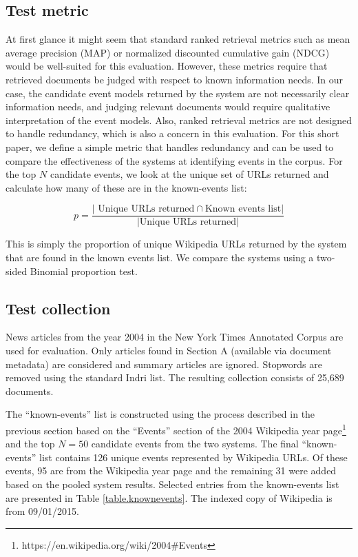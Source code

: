 \documentclass{sig-alternate}
\begin{document}
\subsection{Test metric}
At first glance it might seem that standard ranked retrieval metrics such as mean average precision (MAP) or normalized discounted cumulative gain (NDCG) would be well-suited for this evaluation. However, these metrics require that retrieved documents be judged with respect to known information needs. In our case, the candidate event models returned by the system are not necessarily clear information needs, and judging relevant documents would require qualitative interpretation of the event models. Also, ranked retrieval metrics are not designed to handle redundancy, which is also a concern in this evaluation.  For this short paper, we define a simple metric that handles redundancy and can be used to compare the effectiveness of the systems at identifying events in the corpus.  For the top $N$ candidate events, we look at the unique set of URLs returned and calculate how many of these are in the known-events list:

\[
p = \dfrac{\vert \text{ Unique URLs returned} \cap \text{Known events list} \vert}{\vert \text{Unique URLs returned} \vert}
\]

This is simply the proportion of unique Wikipedia URLs returned by the system that are found in the known events list. We compare the systems using a two-sided Binomial proportion test.

\subsection{Test collection}
News articles from the year 2004 in the New York Times Annotated Corpus \cite{Sandhaus2008} are used for evaluation. Only articles found in Section A (available via document metadata) are considered and summary articles are ignored. Stopwords are removed using the standard Indri list. The resulting collection consists of 25,689 documents.

The ``known-events'' list is constructed using the process described in the previous section based on the ``Events'' section of the 2004 Wikipedia year page\footnote{https://en.wikipedia.org/wiki/2004\#Events} and the top $N=50$ candidate events from the two systems.  The final ``known-events'' list contains 126 unique events represented by Wikipedia URLs. Of these events, 95 are from the Wikipedia year page and the remaining 31 were added based on the pooled system results.  Selected entries from the known-events list are presented in Table \ref{table.knownevents}.  The indexed copy of Wikipedia is from 09/01/2015.
\end{document}
